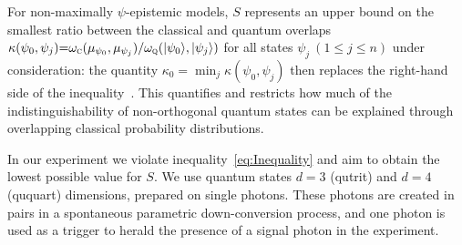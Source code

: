 \documentclass[aps,prl,floatfix,onecolumn,tightenlines,amsmath,amssymb,nofootinbib,12pt]{revtex4-2}
\newcommand{\ket}[1] {| #1 \rangle}
\begin{document}
For non-maximally $\psi$-epistemic models, $S$ represents an upper bound on the smallest ratio between the classical and quantum overlaps $\kappa(\psi_0,\psi_j){=}\omega_{\textsc{c}}(\mu_{\psi_0},\mu_{\psi_j})/ \omega_{\textsc{q}}(\ket{\psi_0},\ket{\psi_j})$ for all states $\psi_j \ (1\leq j\leq n)$ under consideration: the quantity $\kappa_0 = \min_j \kappa(\psi_0,\psi_j)$ then replaces the right-hand side of the inequality~\cite{Branciard2014a}. This quantifies and restricts how much of the indistinguishability of non-orthogonal quantum states can be explained through overlapping classical probability distributions.

In our experiment we violate inequality~\eqref{eq:Inequality} and aim to obtain the lowest possible value for $S$. We use quantum states $d{=}3$ (qutrit) and $d{=}4$ (ququart) dimensions, prepared on single photons. These photons are created in pairs in a spontaneous parametric down-conversion process, and one photon is used as a trigger to herald the presence of a signal photon in the experiment. 
\end{document}
